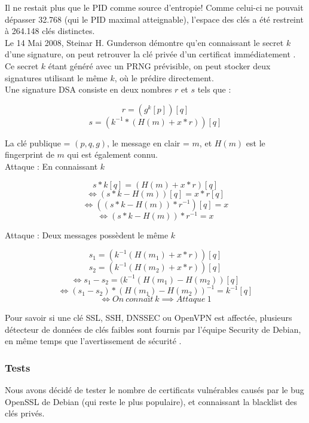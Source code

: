 			Il ne restait plus que le PID comme source d'entropie!
			Comme celui-ci ne pouvait dépasser 32.768 (qui le PID maximal
			atteignable), l'espace des clés a été restreint à 264.148 clés
			distinctes.\\
		
			Le 14 Mai 2008, Steinar H. Gunderson démontre qu'en connaissant 
			le secret $k$ d'une signature, on peut retrouver
			la clé privée d'un certificat immédiatement \cite{gunderson2008}.\\
		
			Ce secret $k$ étant généré avec un PRNG prévisible, on peut stocker
			deux signatures utilisant le même $k$, où le prédire directement.\\
		
			Une signature DSA consiste en deux nombres $r$ et $s$ tels que :
			
			$$r = (g^k [p]) [q]$$
			$$s = (k^{-1} * (H(m) + x * r)) [q]$$
		
			La clé publique = $(p, q, g)$, le message en clair = $m$, et 
			$H(m)$ est le fingerprint de $m$ qui est également connu.\\
		
			Attaque  : En connaissant $k$
			
			$$s * k [q] = (H(m) + x*r) [q]$$
			$$\iff (s * k - H(m)) [q] = x*r [q]$$
			$$\iff ((s*k - H(m))*r^{-1})[q] = x$$
			$$\iff (s*k - H(m))*r^{-1} = x$$
	
			Attaque  : Deux messages possèdent le même $k$
			
			$$s_1 = (k^{-1} (H(m_1) + x*r)) [q]$$
			$$s_2 = (k^{-1} (H(m_2) + x*r)) [q]$$
			$$\iff s_1 - s_2 = (k^{-1} (H(m_1) - H(m_2)) [q]$$
			$$\iff (s_1 - s_2)*(H(m_1) - H(m_2))^{-1} = k^{-1} [q]$$
			$$\iff On\ connaît\ k \implies Attaque\ 1$$
	
			Pour savoir si une clé SSL, SSH, DNSSEC ou OpenVPN est affectée, 
			plusieurs détecteur de données \cite{dowkd.pl} 
			\cite{openssl-blacklist} de clés faibles sont 
			fournis par l'équipe Security de Debian, en même temps que
			l'avertissement de sécurité \cite{debian2008bug}.\\ 
	
		\subsubsection{Tests}
	
			Nous avons décidé de tester le nombre de certificats vulnérables 
			causés 	par le bug OpenSSL de Debian (qui reste le plus populaire), et
			connaissant la blacklist des clés privés. \\
		
